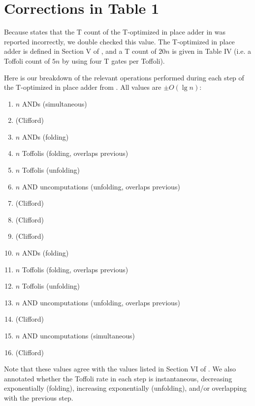 \documentclass[onecolumn,unpublished]{quantumarticle}
\theoremstyle{definition}
\theoremstyle{definition}
\theoremstyle{definition}
\begin{document}



\appendix

\section{Corrections in Table 1}
\label{app:correction}

Because \cite{oonishi2020efficient} states that the T count of the T-optimized in place adder in \cite{thapliyal2020lookahead} was reported incorrectly, we double checked this value.
The T-optimized in place adder is defined in Section V of \cite{thapliyal2020lookahead}, and a T count of $20n$ is given in Table IV (i.e. a Toffoli count of $5n$ by using four T gates per Toffoli).

Here is our breakdown of the relevant operations performed during each step of the T-optimized in place adder from \cite{thapliyal2020lookahead}.
All values are $\pm O(\lg n)$:

\begin{enumerate}
    \item $n$ ANDs (simultaneous)
    \item (Clifford)
    \item $n$ ANDs (folding)
    \item $n$ Toffolis (folding, overlaps previous)
    \item $n$ Toffolis (unfolding)
    \item $n$ AND uncomputations (unfolding, overlaps previous)
    \item (Clifford)
    \item (Clifford)
    \item (Clifford)
    \item $n$ ANDs (folding)
    \item $n$ Toffolis (folding, overlaps previous)
    \item $n$ Toffolis (unfolding)
    \item $n$ AND uncomputations (unfolding, overlaps previous)
    \item (Clifford)
    \item $n$ AND uncomputations (simultaneous)
    \item (Clifford)
\end{enumerate}

Note that these values agree with the values listed in Section VI of \cite{thapliyal2020lookahead}.
We also annotated whether the Toffoli rate in each step is instantaneous, decreasing exponentially (folding), increasing exponentially (unfolding), and/or overlapping with the previous step.
\end{document}
